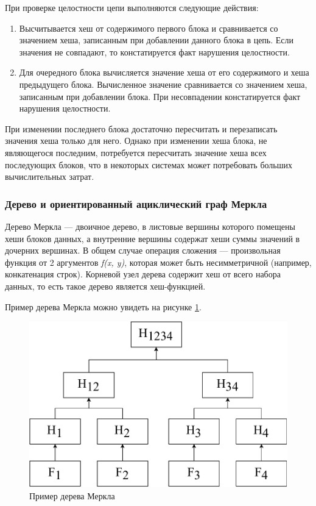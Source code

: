 При проверке целостности цепи выполняются следующие действия:
\begin{enumerate}
	\item Высчитывается хеш от содержимого первого блока и сравнивается со значением хеша, записанным при добавлении данного блока в цепь. Если значения не совпадают, то констатируется факт нарушения целостности.
	\item Для очередного блока вычисляется значение хеша от его содержимого и хеша предыдущего блока. Вычисленное значение сравнивается со значением хеша, записанным при добавлении блока. При несовпадении констатируется факт нарушения целостности.
\end{enumerate}

При изменении последнего блока достаточно пересчитать и перезаписать значения хеша только для него. Однако при изменении хеша блока, не являющегося последним, потребуется пересчитать значение хеша всех последующих блоков, что в некоторых системах может потребовать больших вычислительных затрат.

\subsubsection{Дерево и ориентированный ациклический граф Меркла}

Дерево Меркла \cite{merkle} --- двоичное дерево, в листовые вершины которого помещены хеши блоков данных, а внутренние вершины содержат хеши суммы значений в дочерних вершинах. В общем случае операция сложения --- произвольная функция от 2 аргументов \textit{f(x, y)}, которая может быть несимметричной (например, конкатенация строк). Корневой узел дерева содержит хеш от всего набора данных, то есть такое дерево является хеш-функцией.

Пример дерева Меркла можно увидеть на рисунке \ref{fig:mtree}.

\begin{figure}[hbtp]
	\centering
	\includegraphics[width=\textwidth]{img/merkletree.pdf}
	\caption{Пример дерева Меркла}
	\label{fig:mtree}
\end{figure}

